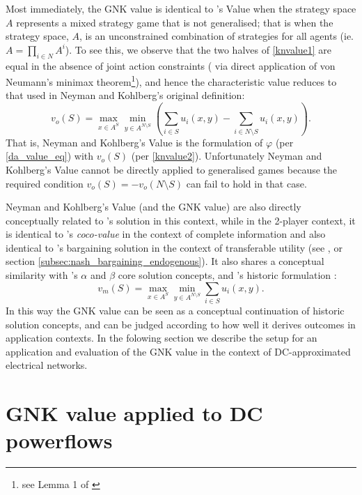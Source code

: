 Most immediately, the GNK value is identical to \cite{value2}'s Value when the strategy space $A$ represents a mixed strategy game that is not generalised; that is when the strategy space, $A$, is an unconstrained combination of strategies for all agents (ie. $A = \prod_{i\in N}A^i$).
To see this, we observe that the two halves of \eqref{knvalue1} are equal in the absence of joint action constraints (%
via direct application of von Neumann's minimax theorem\footnote{see Lemma 1 of \cite{value2}}), 
and hence the characteristic value reduces to that used in Neyman and Kohlberg's original definition:
\begin{equation}\label{knvalue2}v_o(S) = \max_{x\in A^S}\min_{y\in A^{N\setminus S}} \left(\sum_{i\in S} u_i(x,y) - \sum_{i\in N\setminus S} u_i(x,y) \right).\end{equation}
%
That is, Neyman and Kohlberg's Value is the formulation of $\varphi$ (per \eqref{da_value_eq}) 
with $v_o(S)$ (per \eqref{knvalue2}).
Unfortunately Neyman and Kohlberg's Value cannot be directly applied to generalised games because the required condition $v_o(S)=-v_o(N\setminus S)$ can fail to hold in that case. 

Neyman and Kohlberg's Value (and the GNK value) are also directly conceptually related to \cite{values3}'s solution in this context,
while in the 2-player context, it is identical to \cite{kalai1,Kalai2010}'s \textit{coco-value} in the context of complete information  
and also identical to \cite{nash2}'s bargaining solution in the context of transferable utility (see \cite{value2}, or section \ref{subsec:nash_bargaining_endogenous}).
It also shares a conceptual similarity with \cite{aumann1961core}'s $\alpha$ and $\beta$ core solution concepts, and \cite{1944}'s historic formulation :
\begin{equation}\label{knvalue3}v_m(S) = \max_{x\in A^S}\min_{y\in A^{N\setminus S}} \sum_{i\in S} u_i(x,y).\end{equation}
In this way the GNK value can be seen as a conceptual continuation of historic solution concepts, and can be judged according to how well it derives outcomes in application contexts.
In the folowing section we describe the setup for an application and evaluation of the GNK value in the context of DC-approximated electrical networks.


\section{GNK value applied to DC powerflows}\label{more_involved}

